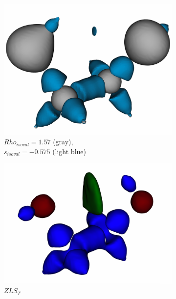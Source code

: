 \begin{figure}[h]
\begin{subfigure}{0.18\linewidth}
\centering
\includegraphics[width=\linewidth]{Images/EthaneDiol/gt.pdf}
\caption{$Rho_{isoval}=1.57$ (gray),\\ $s_{isoval}=-0.575$ (light blue)}
\label{}
\end{subfigure}
\begin{subfigure}{0.18\linewidth}
\centering
\includegraphics[width=\linewidth]{Images/EthaneDiol/zls_3.pdf}
\caption{$ZLS_{T}$}
\label{}
\end{subfigure}
\begin{subfigure}{0.18\linewidth}
\centering

\end{subfigure}
\end{figure}
